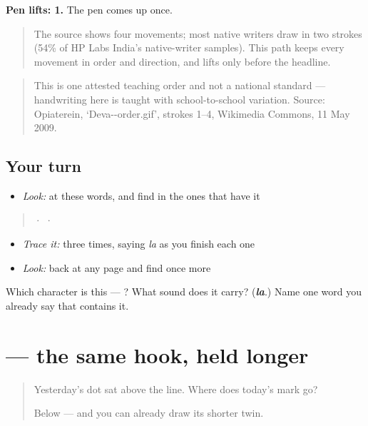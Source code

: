 \textbf{Pen lifts: 1.} The pen comes up once.

\begin{quote}
The source shows four movements; most native writers draw  in two strokes (54\% of HP Labs India's native-writer samples). This path keeps every movement in order and direction, and lifts only before the headline.
\end{quote}

\begin{quote}
This is one attested teaching order and not a national standard — handwriting here is taught with school-to-school variation. Source: Opiaterein, ‘Deva--order.gif’, strokes 1–4, Wikimedia Commons, 11 May 2009.
\end{quote}

\subsection*{Your turn}
\begin{itemize}
\raggedright
  \item \emph{Look:} at these words, and find  in the ones that have it
\end{itemize}

\begin{quote}
  ·    ·  
\end{quote}

\begin{itemize}
\raggedright
  \item \emph{Trace it:}  three times, saying \emph{la} as you finish each one
  \item \emph{Look:} back at any page and find  once more
\end{itemize}

\begin{tcolorbox}[breakable,colback=teal!4,colframe=teal!35!black,title={Before you move on}]
Which character is this — ? What sound does it carry? (\emph{\textbf{la}}.) Name one word you already say that contains it.
\end{tcolorbox}
\section[\texorpdfstring{\hi{ू} (ū)}{ू (ū)}]{ — the same hook, held longer}

\label{lesson:HI-S149-vowel-sign-uu}



\begin{quote}
Yesterday's dot sat above the line. Where does today's mark go?

Below — and you can already draw its shorter twin.
\end{quote}

